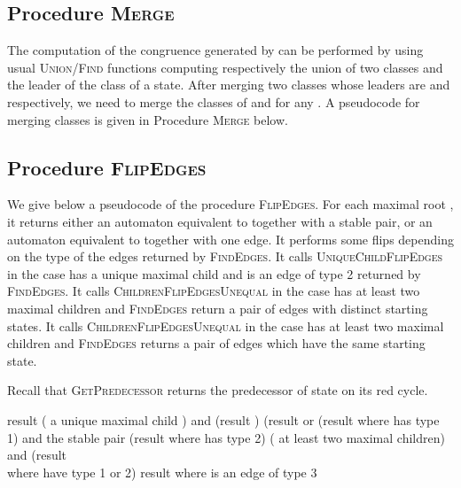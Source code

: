 \documentclass[11pt,a4paper]{article}
\begin{document}
\subsection{Procedure \textsc{Merge}}

The computation of the congruence generated by  can be
performed by using usual \textsc{Union/Find} functions computing
respectively the union of two classes and the leader of the class of a
state. After merging two classes whose leaders are  and 
respectively, we need to merge the classes of  and  for any .  
A pseudocode for merging classes is given in Procedure \textsc{Merge} below. 

\begin{small}
\begin{codebox}
\Procname{}
\li  
\li  
\li  \If  
\li        \Then 
\li               \For  
\li                   \Do 
                   \End
     \End
\li \Return 
\end{codebox}
\end{small}



\subsection{Procedure \textsc{FlipEdges}}

We give below a pseudocode of the procedure
\textsc{FlipEdges}.  For each maximal root , it
returns either an automaton equivalent to  together with a stable
pair, or an automaton equivalent to  together with one edge.
It performs some flips depending on the type of the edges returned by
\textsc{FindEdges}. It calls \textsc{UniqueChildFlipEdges}
in the case  has a unique maximal child and  is an edge of type 2
returned by \textsc{FindEdges}.  It calls
\textsc{ChildrenFlipEdgesUnequal} in the case  has at least
two maximal children and \textsc{FindEdges} return a pair of
edges with distinct starting states.  It calls
\textsc{ChildrenFlipEdgesUnequal} in the case  has at least
two maximal children and \textsc{FindEdges} returns a pair of
edges which have the same starting state.

Recall that \textsc{GetPredecessor} returns the predecessor of
state  on its red cycle.
\begin{small}
\begin{codebox}
\li     result  
\li    \If ( a unique maximal child ) and (result )
\li          \Then \If (result  or (result  where  has type 1)
\li                     \Then {} \li                           \Return  and the stable pair 
\li                     \Else (result  where  has type 2)
\li                           \Return   
                    \End
        \End
\li     \If  ( at least two maximal children) and (result  \\
         where  have type 1 or 2)
\li          \Then  \If 
\li                     \Then \Return   
\li                     \Else \Return   
                     \End
         \End
\li      \If result  where  is an edge of type 3
\li          \Then \Return 
         \End 
\end{codebox}
\end{small}
\end{document}
